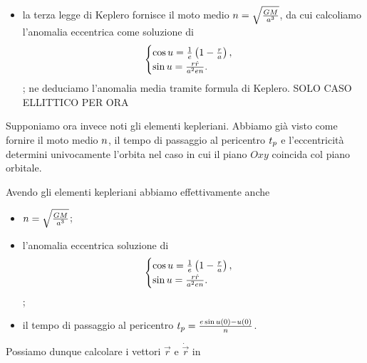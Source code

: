 \begin{itemize}
    $\EnergyPerUnitMass
      = \frac{\ScalarProduct{\dot{r}}{\dot{r}}}{2}
        - \frac{\NewtonConstant\TotalMass}{r}$. Ora, se
    $\EnergyPerUnitMass = 0$, abbiamo visto che l'orbita \`e parabolica
    e abbiamo allora $\SemiMajorAxis = + \infty$; altrimenti abbiamo
    $\SemiMajorAxis
      = - \frac{\NewtonConstant\TotalMass}{2\EnergyPerUnitMass}$;
  \item la terza legge di Keplero fornisce il moto medio
    $n
      = \sqrt{\frac{GM}
        {a^3}}$,
    da cui calcoliamo l'anomalia eccentrica come soluzione di
    \[
      \begin{cases}
        \cos{u} = \frac{1}{e}
          \left ( 1 - \frac{r}{a} \right ),\\
        \sin{u} = \frac{r\dot{r}}
          {a^2 e n}.
      \end{cases}
    \];
    ne deduciamo l'anomalia media tramite formula di Keplero.
    SOLO CASO ELLITTICO PER ORA
\end{itemize}
\par Supponiamo ora invece noti gli elementi kepleriani. Abbiamo gi\`a
visto come fornire il moto medio $n$, il tempo di passaggio al
pericentro ${t_p}$ e l'eccentricit\`a determini
univocamente l'orbita nel caso in cui il piano $Oxy$ coincida col piano
orbitale.
\par Avendo gli elementi kepleriani abbiamo effettivamente anche
\begin{itemize}
  \item $n
          = \sqrt{\frac{GM}
            {a^3}}$;
  \item l'anomalia eccentrica soluzione di
    \[
      \begin{cases}
        \cos{u} = \frac{1}{e}
          \left ( 1 - \frac{r}{a} \right ),\\
        \sin{u} = \frac{r\dot{r}}
          {a^2 e n}.
      \end{cases}
    \];
  \item il tempo di passaggio al pericentro
    ${t_p}
      = \frac{e \sin{u(0)}
          - u(0)}{n}$.
\end{itemize}
\par Possiamo dunque calcolare i vettori $\vec{r}$ e $\dot{\vec{r}}$ in
